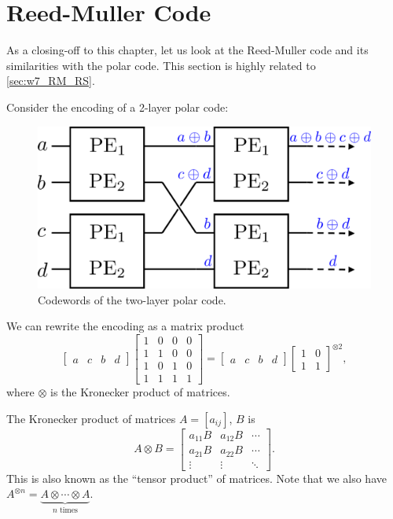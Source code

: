 \section{Reed-Muller Code}
\label{sec:RMcode}

As a closing-off to this chapter, let us look at the Reed-Muller code and its similarities with the polar code. This section is highly related to \autoref{sec:w7_RM_RS}.

Consider the encoding of a 2-layer polar code:
\begin{figure}[H]
    \centering
    \includegraphics[width=0.4\linewidth]{figures/w4_polar_2layer_enc.png}
    \caption{Codewords of the two-layer polar code.}
\end{figure}
We can rewrite the encoding as a matrix product
\begin{equation}
    \left[\begin{matrix}
        a & c & b & d
    \end{matrix}\right] \left[\begin{matrix}
        1 & 0 & 0 & 0 \\
        1 & 1 & 0 & 0 \\
        1 & 0 & 1 & 0 \\
        1 & 1 & 1 & 1
    \end{matrix}\right] = \left[\begin{matrix}
        a & c & b & d
    \end{matrix}\right] \left[\begin{matrix}
        1 & 0 \\
        1 & 1
    \end{matrix}\right]^{\otimes 2},
\end{equation}
where $\otimes$ is the Kronecker product of matrices.
\begin{definition}
    The Kronecker product of matrices $A= [a_{ij}]$, $B$ is
    \begin{equation}
        A\otimes B = \left[\begin{matrix}
            a_{11} B & a_{12} B & \cdots \\
            a_{21} B & a_{22} B & \cdots \\
            \vdots & \vdots & \ddots
        \end{matrix}\right].
    \end{equation}
    This is also known as the ``tensor product'' of matrices. Note that we also have $A^{\otimes n} = \underbrace{A\otimes \cdots\otimes A}_{n \text{ times}}$.
\end{definition}
